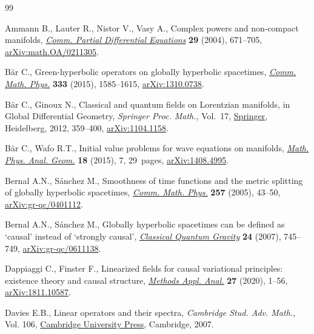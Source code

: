 \documentclass[pdftex]{sigma}
\numberwithin{equation}{section}
\begin{document}
\begin{thebibliography}{99}
\footnotesize\itemsep=0pt

Ammann B., Lauter R., Nistor V., Vasy A., Complex powers and non-compact
 manifolds, \href{https://doi.org/10.1081/PDE-120037329}{\textit{Comm. Partial Differential Equations}} \textbf{29} (2004),
 671--705, \href{https://arxiv.org/abs/math.OA/0211305}{arXiv:math.OA/0211305}.

B\"ar C., Green-hyperbolic operators on globally hyperbolic spacetimes,
 \href{https://doi.org/10.1007/s00220-014-2097-7}{\textit{Comm. Math. Phys.}} \textbf{333} (2015), 1585--1615,
 \href{https://arxiv.org/abs/1310.0738}{arXiv:1310.0738}.

B\"ar C., Ginoux N., Classical and quantum fields on {L}orentzian manifolds, in
 Global Differential Geometry, \textit{Springer Proc. Math.}, Vol.~17,
 \href{https://doi.org/10.1007/978-3-642-22842-1_12}{Springer}, Heidelberg, 2012, 359--400, \href{https://arxiv.org/abs/1104.1158}{arXiv:1104.1158}.

B\"ar C., Wafo R.T., Initial value problems for wave equations on manifolds,
 \href{https://doi.org/10.1007/s11040-015-9176-7}{\textit{Math. Phys. Anal. Geom.}} \textbf{18} (2015), 7, 29~pages,
 \href{https://arxiv.org/abs/1408.4995}{arXiv:1408.4995}.

Bernal A.N., S\'{a}nchez M., Smoothness of time functions and the metric
 splitting of globally hyperbolic spacetimes, \href{https://doi.org/10.1007/s00220-005-1346-1}{\textit{Comm. Math. Phys.}}
 \textbf{257} (2005), 43--50, \href{https://arxiv.org/abs/gr-qc/0401112}{arXiv:gr-qc/0401112}.

Bernal A.N., S\'{a}nchez M., Globally hyperbolic spacetimes can be defined as
 `causal' instead of `strongly causal', \href{https://doi.org/10.1088/0264-9381/24/3/N01}{\textit{Classical Quantum Gravity}}
 \textbf{24} (2007), 745--749, \href{https://arxiv.org/abs/gr-qc/0611138}{arXiv:gr-qc/0611138}.

Dappiaggi C., Finster F., Linearized fields for causal variational principles:
 existence theory and causal structure, \href{https://doi.org/10.4310/MAA.2020.v27.n1.a1}{\textit{Methods Appl. Anal.}}
 \textbf{27} (2020), 1--56, \href{https://arxiv.org/abs/1811.10587}{arXiv:1811.10587}.

Davies E.B., Linear operators and their spectra, \textit{Cambridge Stud. Adv.
 Math.}, Vol. 106, \href{https://doi.org/10.1017/CBO9780511618864}{Cambridge University Press}, Cambridge, 2007.


\end{thebibliography}
\end{document}
